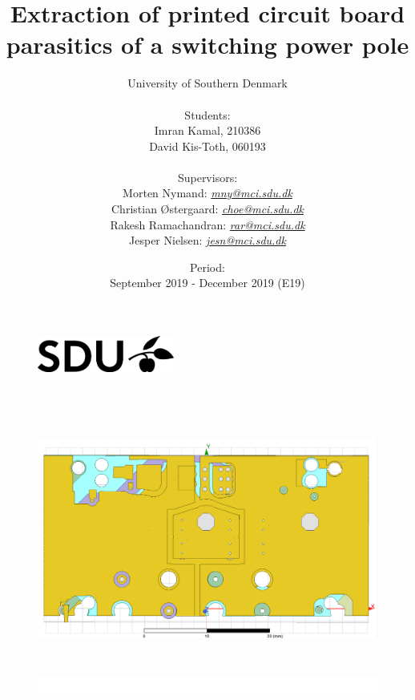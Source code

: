 \documentclass[12pt,a4paper]{article}
\title{Extraction of printed circuit board parasitics of a switching power pole}
\author{University of Southern Denmark
 \\ \\ Students: \\ Imran Kamal, 210386 \\ David Kis-Toth, 060193\\  \\
Supervisors: \\ 
Morten Nymand: \href{mailto:mny@mci.sdu.dk}{\textit{mny@mci.sdu.dk}} \\
Christian Østergaard: \href{mailto:choe@mci.sdu.dk}{\textit{choe@mci.sdu.dk}} \\
Rakesh Ramachandran: \href{mailto:rar@mci.sdu.dk}{\textit{rar@mci.sdu.dk}} \\
Jesper Nielsen: \href{mailto:jesn@mci.sdu.dk }{\textit{jesn@mci.sdu.dk }}}
\date{Period: \\ 
 September 2019 - December 2019 (E19)}
\begin{document}
\begin{titlepage}
\thispagestyle{empty}
    \begin{figure}
        \vspace{-30pt}
        \centering
        \includegraphics[width=0.4\textwidth]{pictures/general/SDU.png}
        \vspace{-50pt}
    \end{figure}
    \vspace{-1cm}

\end{titlepage}



\maketitle
\thispagestyle{empty}
    \begin{figure}
        \vspace{-25cm}
        \centering
        \colorbox{white}{\includegraphics[width=1\textwidth,height=10cm]{pictures/general/PCB_mainpage.png}}
         \vspace{2cm}
    \end{figure}

% 

\newpage

\end{document}
